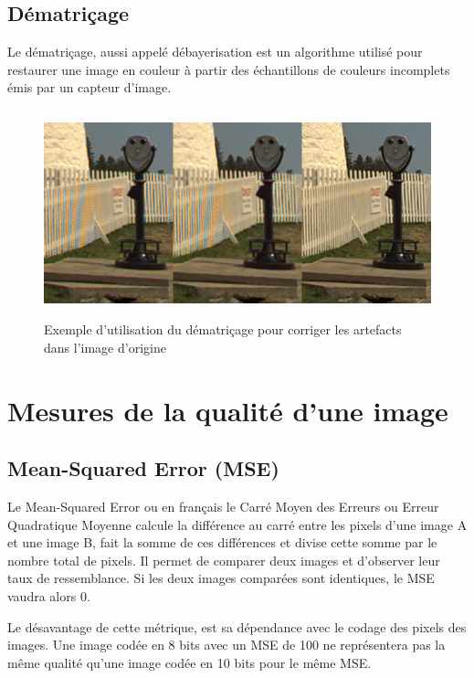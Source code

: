 \documentclass[]{article}
\begin{document}
\hypertarget{duxe9matriuxe7age}{%
\subsection{Dématriçage}\label{duxe9matriuxe7age}}

Le dématriçage, aussi appelé débayerisation est un algorithme utilisé
pour restaurer une image en couleur à partir des échantillons de
couleurs incomplets émis par un capteur d'image.

\begin{figure}
\centering
\includegraphics[height=6cm]{img/demosaic.png}
\caption{Exemple d'utilisation du dématriçage pour corriger les
artefacts dans l'image d'origine}
\end{figure}

\newpage

\hypertarget{mesures-de-la-qualituxe9-dune-image}{%
\section{Mesures de la qualité d'une
image}\label{mesures-de-la-qualituxe9-dune-image}}

\hypertarget{mean-squared-error-mse}{%
\subsection{Mean-Squared Error (MSE)}\label{mean-squared-error-mse}}

Le Mean-Squared Error ou en français le Carré Moyen des Erreurs ou
Erreur Quadratique Moyenne calcule la différence au carré entre les
pixels d'une image A et une image B, fait la somme de ces différences et
divise cette somme par le nombre total de pixels. Il permet de comparer
deux images et d'observer leur taux de ressemblance. Si les deux images
comparées sont identiques, le MSE vaudra alors \(0\).

Le désavantage de cette métrique, est sa dépendance avec le codage des
pixels des images. Une image codée en 8 bits avec un MSE de 100 ne
représentera pas la même qualité qu'une image codée en 10 bits pour le
même MSE.
\end{document}
